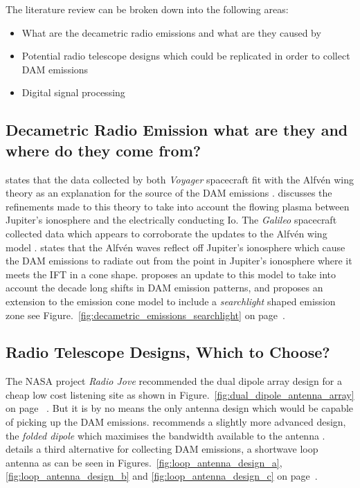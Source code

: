 The literature review can be broken down into the following areas:


\begin{itemize}
  \item[\textbullet] What are the decametric radio emissions and what are they caused by
  \item[\textbullet] Potential radio telescope designs which could be replicated in order to collect DAM emissions
  \item[\textbullet] Digital signal processing
\end{itemize}

\subsection*{Decametric Radio Emission what are they and where do they come from?}
\cite{belcher87} states that the data collected by both \textit{Voyager} spacecraft fit with the Alfv\'en wing theory as an explanation for the source of the \gls{DAM} emissions \citep{belcher87}. \cite{kivelson96} discusses the refinements made to this theory to take into account the flowing plasma between Jupiter's ionosphere and the electrically conducting Io. The \textit{Galileo} spacecraft collected data which appears to corroborate the updates to the Alfv\'en wing model \citep{kivelson96}. \cite{bose08} states that the Alfv\'en waves reflect off Jupiter's ionosphere which cause the \gls{DAM} emissions to radiate out from the point in Jupiter's ionosphere where it meets the \gls{IFT} in a cone shape. \cite{imai-08} proposes an update to this model to take into account the decade long shifts in \gls{DAM} emission patterns, and proposes an extension to the emission cone model to include a \textit{searchlight} shaped emission zone \citep{imai-08} see Figure.~\ref{fig:decametric_emissions_searchlight} on page~\pageref{fig:decametric_emissions_searchlight}.

\subsection*{Radio Telescope Designs, Which to Choose?}
The NASA project \textit{Radio Jove} recommended the dual dipole array design for a cheap low cost listening site as shown in Figure.~\ref{fig:dual_dipole_antenna_array} on page~\pageref{fig:dual_dipole_antenna_array} \citep{nasa12}. But it is by no means the only antenna design which would be capable of picking up the \gls{DAM} emissions. \cite{wilkinson94} recommends a slightly more advanced design, the \textit{folded dipole} which maximises the bandwidth available to the antenna \citep{wilkinson94}. \cite{greef-12} details a third alternative for collecting \gls{DAM} emissions, a shortwave loop antenna as can be seen in Figures.~\ref{fig:loop_antenna_design_a}, \ref{fig:loop_antenna_design_b} and \ref{fig:loop_antenna_design_c} on page~\pageref{fig:loop_antenna_design_a}.

